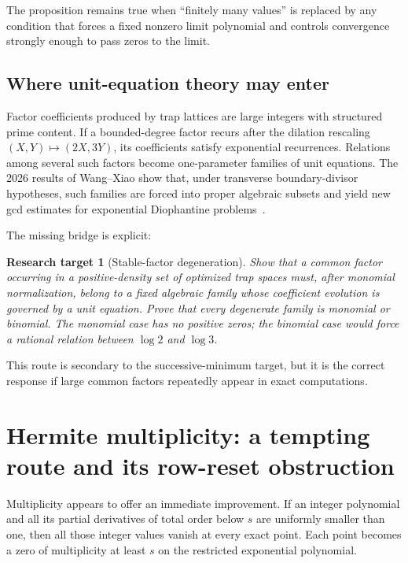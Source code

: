 \documentclass[11pt,oneside]{article}
\newtheorem{target}[theorem]{Research target}
\theoremstyle{definition}
\theoremstyle{remark}
\begin{document}
The proposition remains true when ``finitely many values'' is replaced by any condition that
forces a fixed nonzero limit polynomial and controls convergence strongly enough to pass zeros
to the limit.

\subsection{Where unit-equation theory may enter}

Factor coefficients produced by trap lattices are large integers with structured prime
content.  If a bounded-degree factor recurs after the dilation rescaling
$(X,Y)\mapsto(2X,3Y)$, its coefficients satisfy exponential recurrences.  Relations among
several such factors become one-parameter families of unit equations.  The 2026 results of
Wang--Xiao show that, under transverse boundary-divisor hypotheses, such families are forced
into proper algebraic subsets and yield new gcd estimates for exponential Diophantine
problems~\cite{WangXiao2026}.

The missing bridge is explicit:

\begin{target}[Stable-factor degeneration]
\label{target:stable-factor}
Show that a common factor occurring in a positive-density set of optimized trap spaces must,
after monomial normalization, belong to a fixed algebraic family whose coefficient evolution
is governed by a unit equation.  Prove that every degenerate family is monomial or binomial.
The monomial case has no positive zeros; the binomial case would force a rational relation
between $\log2$ and $\log3$.
\end{target}

This route is secondary to the successive-minimum target, but it is the correct response if
large common factors repeatedly appear in exact computations.

\section{Hermite multiplicity: a tempting route and its row-reset obstruction}
\label{sec:jets}

Multiplicity appears to offer an immediate improvement.  If an integer polynomial and all its
partial derivatives of total order below $s$ are uniformly smaller than one, then all those
integer values vanish at every exact point.  Each point becomes a zero of multiplicity at least
$s$ on the restricted exponential polynomial.
\end{document}
